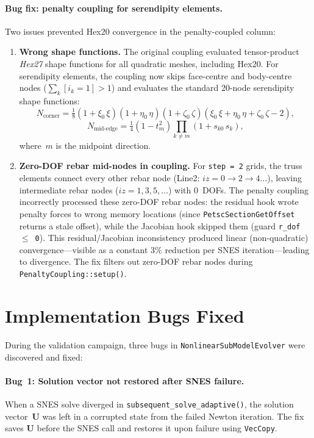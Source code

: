 \paragraph{Bug fix: penalty coupling for serendipity elements.}
Two issues prevented Hex20 convergence in the penalty-coupled
column:
\begin{enumerate}
  \item \textbf{Wrong shape functions.}
    The original coupling evaluated tensor-product \emph{Hex27} shape
    functions for all quadratic meshes, including Hex20.  For
    serendipity elements, the coupling now skips face-centre and
    body-centre nodes
    ($\sum_{k}[i_k = 1] > 1$) and evaluates the standard 20-node
    serendipity shape functions:
    \[
      N_{\text{corner}} = \tfrac{1}{8}
        (1 + \xi_0\,\xi)(1 + \eta_0\,\eta)(1 + \zeta_0\,\zeta)
        (\xi_0\,\xi + \eta_0\,\eta + \zeta_0\,\zeta - 2),
    \]
    \[
      N_{\text{mid-edge}} = \tfrac{1}{4}
        (1 - t_m^2)\!\prod_{k \neq m}(1 + s_{k0}\,s_k),
    \]
    where~$m$ is the midpoint direction.
  \item \textbf{Zero-DOF rebar mid-nodes in coupling.}
    For \texttt{step\,=\,2} grids, the truss elements connect every
    other rebar node (Line2: $iz = 0 \to 2 \to 4\ldots$), leaving
    intermediate rebar nodes ($iz = 1, 3, 5, \ldots$) with
    0~DOFs.  The penalty coupling incorrectly processed these
    zero-DOF rebar nodes: the residual hook wrote penalty forces
    to wrong memory locations (since
    \texttt{PetscSectionGetOffset} returns a stale offset), while
    the Jacobian hook skipped them (guard \texttt{r\_dof\,$\leq$\,0}).
    This residual/Jacobian inconsistency produced linear
    (non-quadratic) convergence---visible as a constant 3\%
    reduction per SNES iteration---leading to divergence.
    The fix filters out zero-DOF rebar nodes during
    \texttt{PenaltyCoupling::setup()}.
\end{enumerate}


\section{Implementation Bugs Fixed}
\label{sec:cyclic-bugs}

During the validation campaign, three bugs in
\texttt{NonlinearSubModelEvolver} were discovered and fixed:

\paragraph{Bug~1: Solution vector not restored after SNES failure.}
When a SNES solve diverged in \texttt{subsequent\_solve\_adaptive()},
the solution vector~$\mathbf{U}$ was left in a corrupted state from the
failed Newton iteration.  The fix saves $\mathbf{U}$ before the SNES
call and restores it upon failure using \texttt{VecCopy}.

